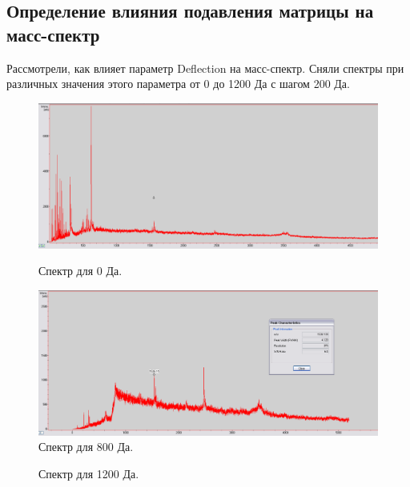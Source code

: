 \documentclass[12pt]{article}
\begin{document}
\begin{flushleft}
\subsection{ Определение влияния подавления матрицы на масс-спектр}
Рассмотрели, как влияет параметр Deflection на масс-спектр. Сняли спектры при
различных значения этого параметра от 0 до 1200 Да с шагом 200 Да.
\begin{figure}[!h]
\begin{center}
\begin{minipage}[h]{0.4\linewidth}
\includegraphics[width=1.2\linewidth]{26}
\caption{Спектр для 0 Да.} %
\label{ris:experimoriginal} %
\end{minipage}
\hfill 
\begin{minipage}[h]{0.4\linewidth}
\includegraphics[width=1.2\linewidth]{27}
\caption{Спектр для 800 Да.}
\label{ris:experimcoded}
\end{minipage}
\end{center}
\end{figure}
\begin{figure}[!h]
\caption{Спектр для 1200 Да.}
\label{ris:image}
\end{figure}


\end{flushleft}
\end{document}
